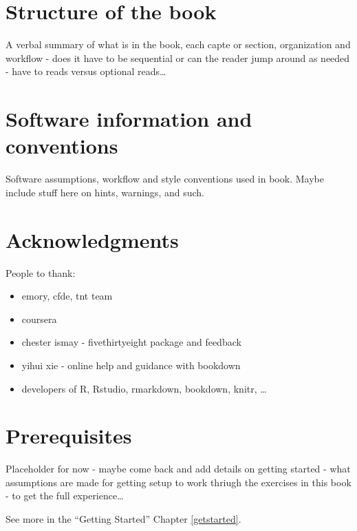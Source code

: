 \documentclass[]{book}
\providecommand{\tightlist}{%
  \setlength{\itemsep}{0pt}\setlength{\parskip}{0pt}}
\theoremstyle{definition}
\theoremstyle{definition}
\theoremstyle{definition}
\theoremstyle{remark}
\begin{document}
\section*{Structure of the book}\label{structure-of-the-book}

A verbal summary of what is in the book, each capte or section,
organization and workflow - does it have to be sequential or can the
reader jump around as needed - have to reads versus optional
reads\ldots{}

\section*{Software information and
conventions}\label{software-information-and-conventions}

Software assumptions, workflow and style conventions used in book. Maybe
include stuff here on hints, warnings, and such.

\section*{Acknowledgments}\label{acknowledgments}

People to thank:

\begin{itemize}
\tightlist
\item
  emory, cfde, tnt team
\item
  coursera
\item
  chester ismay - fivethirtyeight package and feedback
\item
  yihui xie - online help and guidance with bookdown
\item
  developers of R, Rstudio, rmarkdown, bookdown, knitr, \ldots{}
\end{itemize}

\section*{Prerequisites}\label{prerequisites}

Placeholder for now - maybe come back and add details on getting started
- what assumptions are made for getting setup to work thriugh the
exercises in this book - to get the full experience\ldots{}

See more in the ``Getting Started'' Chapter \ref{getstarted}.
\end{document}
